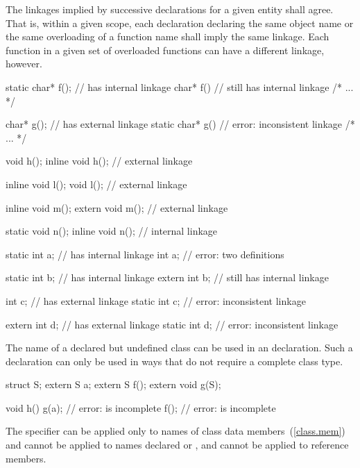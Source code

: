 \pnum
The linkages implied by successive declarations for a given entity shall
agree. That is, within a given scope, each declaration declaring the
same object name or the same overloading of a function name shall imply
the same linkage. Each function in a given set of overloaded functions
can have a different linkage, however.
\enterexample
{}%

\begin{codeblock}
static char* f();               //  has internal linkage
char* f()                       //  still has internal linkage
    { /* ... */ }

char* g();                      //  has external linkage
static char* g()                // error: inconsistent linkage
    { /* ... */ }

void h();
inline void h();                // external linkage

inline void l();
void l();                       // external linkage

inline void m();
extern void m();                // external linkage

static void n();
inline void n();                // internal linkage

static int a;                   //  has internal linkage
int a;                          // error: two definitions

static int b;                   //  has internal linkage
extern int b;                   //  still has internal linkage

int c;                          //  has external linkage
static int c;                   // error: inconsistent linkage

extern int d;                   //  has external linkage
static int d;                   // error: inconsistent linkage
\end{codeblock}
\exitexampleb

\pnum
{}%
The name of a declared but undefined class can be used in an
 declaration. Such a declaration can only be used in ways
that do not require a complete class type.
\enterexample

\begin{codeblock}
struct S;
extern S a;
extern S f();
extern void g(S);

void h()
{
    g(a);                       // error:  is incomplete
    f();			// error:  is incomplete
}
\end{codeblock}
\exitexampleb
The  specifier can be applied only to names of class data
members~(\ref{class.mem}) and cannot be applied to names declared
 or , and cannot be applied to reference
members.
\enterexample

